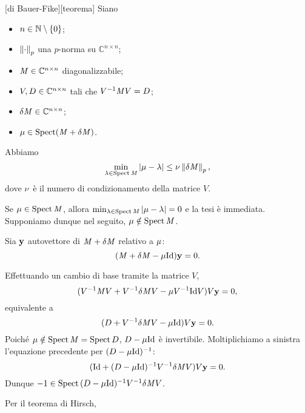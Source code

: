 \begin{Theorem}
  [di Bauer-Fike][teorema]
  Siano
  \begin{itemize}
    \item $n \in \mathbb{N} \setminus \lbrace 0 \rbrace$;
    \item $\Norm{\cdot}[p]$ una $p$-norma su $\mathbb{C}^{n \times n}$;
    \item $\mathit{M} \in \mathbb{C}^{n \times n}$ diagonalizzabile;
    \item $V, D \in \mathbb{C}^{n \times n}$ tali che
      $V^{-1} \mathit{M} V = D$;
    \item $\Perturbation{\Matrix} \in \mathbb{C}^{n \times n}$;
    \item $\VarEigenvalue \in \Spectrum(\Matrix + \Perturbation{\Matrix})$.
  \end{itemize}
  Abbiamo
  \[
    \min_{\Eigenvalue \in \Spectrum{\Matrix}}
    \AbsoluteValue{\VarEigenvalue - \Eigenvalue}
    \leq \VarMatrixConditionNumber \Norm{\Perturbation{\Matrix}}[p],
  \]
  dove $\nu$ \`e il numero di condizionamento della matrice
  $V$.
\end{Theorem}
\Proof Se $\mu \in \operatorname{Spect}{\mathit{M}}$, allora 
$\min_{\lambda \in \operatorname{Spect}{\mathit{M}}}
\left \lvert \mu - \lambda \right \rvert = 0$ e la tesi \`e immediata.
Supponiamo dunque nel seguito, $\mu \notin \operatorname{Spect}{\mathit{M}}$.
\par Sia $\VarEigenvector$ autovettore di $\Matrix + \Perturbation{\Matrix}$
relativo a $\mu$:
\[
  (\Matrix + \Perturbation{\Matrix} - \VarEigenvalue\Identity) \VarEigenvector
  = 0.
\]
\par Effettuando un cambio di base tramite la matrice $V$,
\[
  (V^{-1}\Matrix V
  + V^{-1} \Perturbation{\Matrix} V
  - \VarEigenvalue V^{-1} \Identity V) V \VarEigenvector = 0,
\]
equivalente a
\[
  (\DiagonalMatrix
  + V^{-1} \Perturbation{\Matrix} V
  - \VarEigenvalue \Identity) V \VarEigenvector = 0.
\]
Poich\'e
$\mu \notin \operatorname{Spect}{\mathit{M}} = \operatorname{Spect}{D}$,
$\DiagonalMatrix - \VarEigenvalue\Identity$ \`e invertibile. Moltiplichiamo a
sinistra l'equazione precedente per
$(\DiagonalMatrix - \VarEigenvalue\Identity)^{-1}$:
\[
  (\Identity
  + (\DiagonalMatrix - \VarEigenvalue\Identity)^{-1}
    V^{-1} \Perturbation{\Matrix} V) V \VarEigenvector = 0.
\]
Dunque
$-1 \in \Spectrum{
(\DiagonalMatrix - \VarEigenvalue\Identity)^{-1} V^{-1}
\Perturbation{\Matrix} V}$.
\par Per il teorema di Hirsch,
